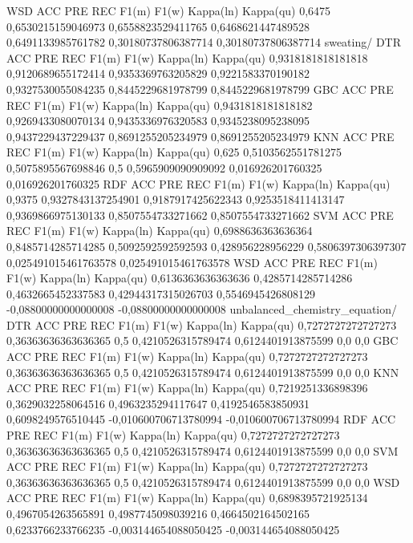 WSD
ACC	PRE	REC	F1(m)	F1(w)	Kappa(ln)	Kappa(qu)
0,6475	0,6530215159046973	0,6558823529411765	0,6468621447489528	0,6491133985761782	0,30180737806387714	0,30180737806387714
sweating/
DTR
ACC	PRE	REC	F1(m)	F1(w)	Kappa(ln)	Kappa(qu)
0,9318181818181818	0,9120689655172414	0,9353369763205829	0,9221583370190182	0,9327530055084235	0,8445229681978799	0,8445229681978799
GBC
ACC	PRE	REC	F1(m)	F1(w)	Kappa(ln)	Kappa(qu)
0,9431818181818182	0,9269433080070134	0,9435336976320583	0,9345238095238095	0,9437229437229437	0,8691255205234979	0,8691255205234979
KNN
ACC	PRE	REC	F1(m)	F1(w)	Kappa(ln)	Kappa(qu)
0,625	0,5103562551781275	0,5075895567698846	0,5	0,5965909090909092	0,016926201760325	0,016926201760325
RDF
ACC	PRE	REC	F1(m)	F1(w)	Kappa(ln)	Kappa(qu)
0,9375	0,9327843137254901	0,9187917425622343	0,9253518411413147	0,9369866975130133	0,8507554733271662	0,8507554733271662
SVM
ACC	PRE	REC	F1(m)	F1(w)	Kappa(ln)	Kappa(qu)
0,6988636363636364	0,8485714285714285	0,5092592592592593	0,428956228956229	0,5806397306397307	0,025491015461763578	0,025491015461763578
WSD
ACC	PRE	REC	F1(m)	F1(w)	Kappa(ln)	Kappa(qu)
0,6136363636363636	0,4285714285714286	0,4632665452337583	0,42944317315026703	0,5546945426808129	-0,08800000000000008	-0,08800000000000008
unbalanced_chemistry_equation/
DTR
ACC	PRE	REC	F1(m)	F1(w)	Kappa(ln)	Kappa(qu)
0,7272727272727273	0,36363636363636365	0,5	0,4210526315789474	0,6124401913875599	0,0	0,0
GBC
ACC	PRE	REC	F1(m)	F1(w)	Kappa(ln)	Kappa(qu)
0,7272727272727273	0,36363636363636365	0,5	0,4210526315789474	0,6124401913875599	0,0	0,0
KNN
ACC	PRE	REC	F1(m)	F1(w)	Kappa(ln)	Kappa(qu)
0,7219251336898396	0,3629032258064516	0,4963235294117647	0,4192546583850931	0,6098249576510445	-0,010600706713780994	-0,010600706713780994
RDF
ACC	PRE	REC	F1(m)	F1(w)	Kappa(ln)	Kappa(qu)
0,7272727272727273	0,36363636363636365	0,5	0,4210526315789474	0,6124401913875599	0,0	0,0
SVM
ACC	PRE	REC	F1(m)	F1(w)	Kappa(ln)	Kappa(qu)
0,7272727272727273	0,36363636363636365	0,5	0,4210526315789474	0,6124401913875599	0,0	0,0
WSD
ACC	PRE	REC	F1(m)	F1(w)	Kappa(ln)	Kappa(qu)
0,6898395721925134	0,4967054263565891	0,4987745098039216	0,4664502164502165	0,6233766233766235	-0,003144654088050425	-0,003144654088050425
